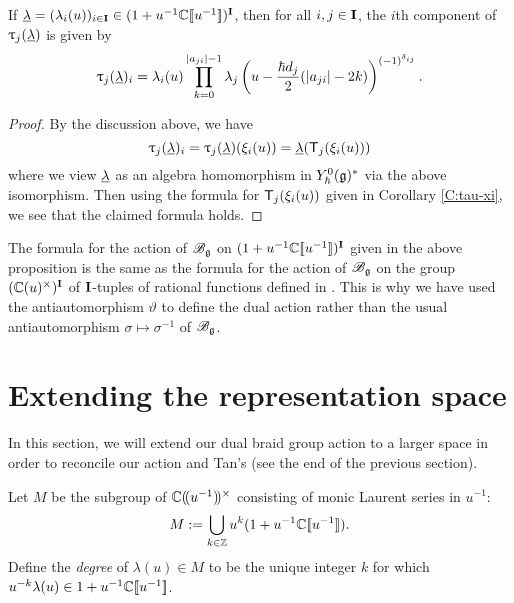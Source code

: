 \begin{proposition}\label{P:Tan-formula}
    If $\ul = (\lambda_i(u))_{i\in\I}\in (1+u^{-1}\C\db{u^{-1}})^\I$, then for all $i,j\in\I$, the $i$th component of $\braid_j(\ul)$ is given by
    \[\braid_j(\ul)_i = \lambda_i(u)\prod_{k=0}^{\abs{a_{ji}}-1}\lambda_j\left(u-\frac{\hbar d_j}{2}(\abs{a_{ji}}-2k)\right)^{(-1)^{\delta_{ij}}}.\]
\end{proposition}
\begin{proof}
    By the discussion above, we have
    \[\braid_j(\ul)_i = \braid_j(\ul)(\xi_i(u)) = \ul(\mbraid_j(\xi_i(u)))\]
    where we view $\ul$ as an algebra homomorphism in $\Yhg[0]^*$ via the above isomorphism.
    Then using the formula for $\mbraid_j(\xi_i(u))$ given in Corollary \ref{C:tau-xi}, we see that the claimed formula holds.
\end{proof}

The formula for the action of $\Bg$ on $(1+u^{-1}\C\db{u^{-1}})^\I$ given in the above proposition is the same as the formula for the action of $\Bg$ on the group $(\C(u)^\times)^\I$ of $\I$-tuples of rational functions defined in \cite[Prop. 3.1]{tan_braid_2015}.
This is why we have used the antiautomorphism $\vartheta$ to define the dual action rather than the usual antiautomorphism $\sigma\mapsto\sigma^{-1}$ of $\Bg$.


\section{Extending the representation space}

In this section, we will extend our dual braid group action to a larger space in order to reconcile our action and Tan's (see the end of the previous section).

Let $M$ be the subgroup of $\C\dparen{u^{-1}}^\times$ consisting of monic Laurent series in $u^{-1}$:
\[M := \bigcup_{k\in\Z}u^{k}(1+u^{-1}\C\db{u^{-1}}).\]
Define the \emph{degree} of $\lambda(u)\in M$ to be the unique integer $k$ for which $u^{-k}\lambda(u)\in 1+u^{-1}\C\db{u^{-1}}$.

